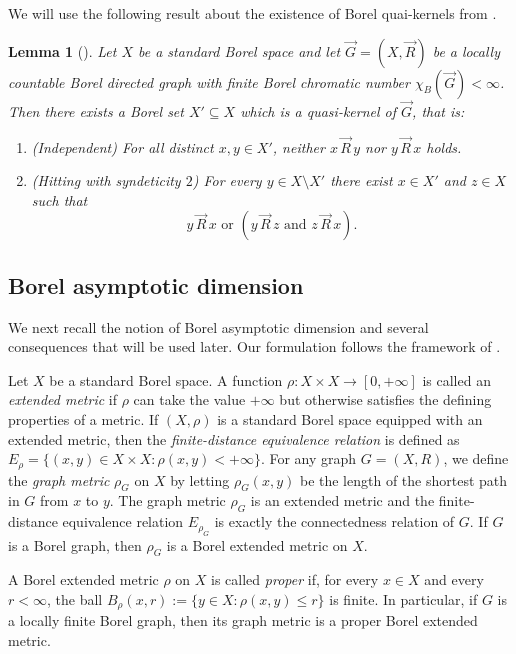 \documentclass[11pt, reqno, a4paper]{amsart}
\newtheorem{lemma}[theorem]{Lemma}
\theoremstyle{definition}
\theoremstyle{plain}
\begin{document}
We will use the following result about the existence of Borel quai-kernels from \cite{Wang2026}.

\begin{lemma}[{\cite[Theorem 1.2]{Wang2026}}]
\label{lem:qk}
Let $X$ be a standard Borel space and let $\vec{G}=(X,\vec{R})$ be a locally countable Borel directed graph with finite Borel chromatic number
$\chi_B(\vec{G})<\infty$.
Then there exists a Borel set $X'\subseteq X$ which is a \emph{quasi-kernel} of $\vec{G}$, that is:
\begin{enumerate}[label=(\roman*),leftmargin=2.7em]
\item \textup{(Independent)} For all distinct $x,y\in X'$, neither $x\,\vec{R}\,y$ nor $y\,\vec{R}\,x$ holds.
\item \textup{(Hitting with syndeticity $2$)} For every $y\in X\setminus X'$ there exist $x\in X'$ and $z\in X$ such that
$$
y\,\vec{R}\,x
\mbox{ or }
(y\,\vec{R}\,z \mbox{ and } z\,\vec{R}\,x).
$$
\end{enumerate}
\end{lemma}

\subsection{Borel asymptotic dimension}

We next recall the notion of Borel asymptotic dimension and several consequences
that will be used later. Our formulation follows the framework of
\cite{ConleyJacksonMarksSewardTuckerDrob2023}.

Let $X$ be a standard Borel space. A function $\rho\colon X\times X\to [0, +\infty]$ is called an \emph{extended metric} if $\rho$ can take the value $+\infty$ but otherwise satisfies the defining properties of a metric. If $(X, \rho)$ is a standard Borel space equipped with an extended metric, then the \emph{finite-distance equivalence relation} is defined as $E_\rho=\{(x,y)\in X\times X\colon \rho(x,y)<+\infty\}$. For any graph $G=(X, R)$, we define the \emph{graph metric} $\rho_G$ on $X$ by letting $\rho_G(x,y)$ be the length of the shortest path in $G$ from $x$ to $y$. The graph metric $\rho_G$ is an extended metric and the finite-distance equivalence relation $E_{\rho_G}$ is exactly the connectedness relation of $G$. If $G$ is a Borel graph, then $\rho_G$ is a Borel extended metric on $X$.

A Borel extended metric $\rho$ on $X$
is called \emph{proper} if, for every $x\in X$ and every $r<\infty$, the ball
$B_\rho(x,r):=\{y\in X:\rho(x,y)\le r\}$
is finite. In particular, if $G$ is a locally finite Borel graph, then its
graph metric is a proper Borel extended metric.
\end{document}
